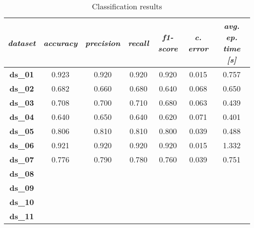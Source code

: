 \begin{table}[H]
\centering
\caption{Classification results}
\label{tab:classification_results}
\resizebox{\textwidth}{!} {
\begin{tabular}{|c|c|c|c|c|c|c|}
\hline
\textit{dataset} & \textit{accuracy} & \textit{precision} & \textit{recall} & \textit{f1-score} & \textit{c. error} & \textit{avg. ep. time {[}s{]}} \\ \hline
\textbf{ds\_01}  & 0.923             & 0.920              & 0.920           & 0.920             & 0.015             & 0.757                          \\ \hline
\textbf{ds\_02}  & 0.682             & 0.660              & 0.680           & 0.640             & 0.068             & 0.650                          \\ \hline
\textbf{ds\_03}  & 0.708             & 0.700              & 0.710           & 0.680             & 0.063             & 0.439                          \\ \hline
\textbf{ds\_04}  & 0.640             & 0.650              & 0.640           & 0.620             & 0.071             & 0.401                          \\ \hline
\textbf{ds\_05}  & 0.806             & 0.810              & 0.810           & 0.800             & 0.039             & 0.488                          \\ \hline
\textbf{ds\_06}  & 0.921             & 0.920              & 0.920           & 0.920             & 0.015             & 1.332                          \\ \hline
\textbf{ds\_07}  & 0.776             & 0.790              & 0.780           & 0.760             & 0.039             & 0.751                          \\ \hline
\textbf{ds\_08}  &                   &                    &                 &                   &                   &                                \\ \hline
\textbf{ds\_09}  &                   &                    &                 &                   &                   &                                \\ \hline
\textbf{ds\_10}  &                   &                    &                 &                   &                   &                                \\ \hline
\textbf{ds\_11}  &                   &                    &                 &                   &                   &                                \\ \hline

\end{tabular}}
\end{table}
